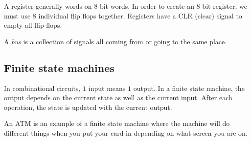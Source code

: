 A register generally words on \(8\) bit words.
In order to create an \(8\) bit register, we must use \(8\) individual flip flops together.
Registers have a CLR (clear) signal to empty all flip flops.

A \emph{bus} is a collection of signals all coming from or going to the same place.

\subsection{Finite state machines}\label{sub:finite_state_machines}

In combinational circuits, \(1\) input means \(1\) output.
In a finite state machine, the output depends on the current state as well as the current input.
After each operation, the state is updated with the current output.

An ATM is an example of a finite state machine where the machine will do different things when you put your card in depending on what screen you are on.
